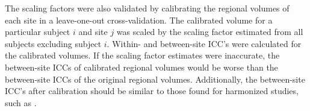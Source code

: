 The scaling factors were also validated by calibrating the regional volumes of each site in a leave-one-out cross-validation. The calibrated volume for a particular subject $i$ and site $j$ was scaled by the scaling factor estimated from all subjects excluding subject $i$. Within- and between-site ICC's were calculated for the calibrated volumes. If the scaling factor estimates were inaccurate, the between-site ICCs of calibrated regional volumes would be worse than the between-site ICCs of the original regional volumes. Additionally, the between-site ICC's after calibration should be similar to those found for harmonized studies, such as \cite{cannon2014}.